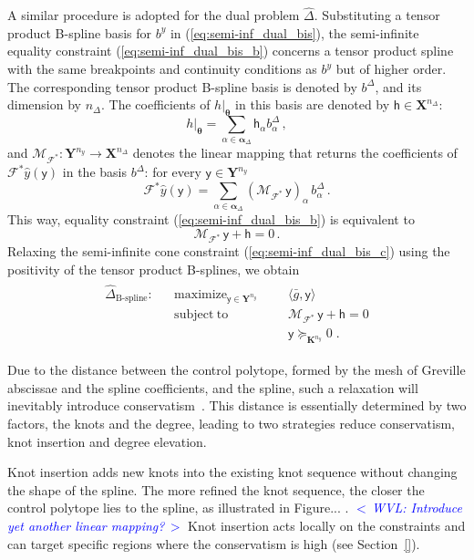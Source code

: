 \documentclass{article}
\DeclareMathOperator*{\maximize}{maximize}
\DeclareMathOperator*{\subj}{subject\;to}
\newcommand{\commentWVL}[1]{\noindent \textcolor{blue}{\emph{$<\,$WVL: #1$\,>$}}}%
\newcommand{\adj}{\ast}                     %
\newcommand{\Ppar}{{\bm{\theta}}}                   %
\newcommand{\X}{\mathbf{X}}                         %
\newcommand{\Y}{\mathbf{Y}}                         %
\newcommand{\K}{\mathbf{K}}                         %
\newcommand{\calF}{\mathcal{F}}                     %
\newcommand{\by}{b^y}               %
\newcommand{\cy}{\textsf{y}}        %
\newcommand{\ny}{{n_y}}             %
\newcommand{\Alpha}{\bm{\alpha}}    %
\newcommand{\meang}{\bar{g}}        %
\newcommand{\bDelta}{b^\Delta}          %
\newcommand{\bDeltaa}{b^\Delta_\alpha}  %
\newcommand{\nDelta}{{n_\Delta}}        %
\newcommand{\ch}{\textsf{h}}            %
\newcommand{\cha}{\textsf{h}_\alpha}    %
\newcommand{\calMFadj}{\mathcal{M}_{\mathcal{F}^\adj}}
\begin{document}
A similar procedure is adopted for the dual problem $\hat{\Delta}$. Substituting a tensor product B-spline basis for $\by$ in (\ref{eq:semi-inf_dual_bis}), the semi-infinite equality constraint (\ref{eq:semi-inf_dual_bis_b}) concerns a tensor product spline with the same breakpoints and continuity conditions as $\by$ but of higher order. The corresponding tensor product B-spline basis is denoted by $\bDelta$, and its dimension by $\nDelta$. The coefficients of $h|_\Ppar$ in this basis are denoted by $\ch\in\X^\nDelta$:
\[ h|_\Ppar = \sum_{\alpha\in\Alpha_\Delta} \cha \bDeltaa \,,%
\]
and $\calMFadj:\Y^\ny \rightarrow \X^\nDelta$ denotes the linear mapping that returns the coefficients of $\calF^\adj\hat{y}(\cy)$ in the basis $\bDelta$: for every $\cy\in\Y^\ny$
\[ \calF^\adj \hat{y}(\cy) = \sum_{\alpha\in\Alpha_\Delta} (\calMFadj \, \cy)_\alpha \, \bDeltaa\,. %
\]
This way, equality constraint (\ref{eq:semi-inf_dual_bis_b}) is equivalent to
\[ \calMFadj\,\cy + \ch = 0 \,.
\]
Relaxing the semi-infinite cone constraint (\ref{eq:semi-inf_dual_bis_c}) using the positivity of the tensor product B-splines, we obtain
\begin{gather}\label{eq:Bprog_dual}
\begin{aligned}
\hat{\Delta}_{\text{B-spline}}: && \maximize_{\cy\in\Y^\ny} &&& \langle \meang, \cy \rangle \\%
                                && \subj                    &&& \calMFadj\,\cy + \ch = 0 \\%
                                &&                          &&& \cy \succeq_{\K^\ny} 0     \;.%
\end{aligned}
\end{gather}

Due to the distance between the control polytope, formed by the mesh of
Greville abscissae and the spline coefficients, and the spline, such a
relaxation will inevitably introduce conservatism~\cite{deBoor_2001}. This distance
is essentially determined by two factors, the knots and the degree, leading to
two strategies reduce conservatism, knot insertion and degree elevation.

Knot insertion adds new knots into the existing knot sequence without changing
the shape of the spline. The more refined the knot sequence, the closer the
control polytope lies to the spline, as illustrated in Figure... .
\commentWVL{Introduce yet another linear mapping?} Knot insertion acts locally
on the constraints and can target specific regions where the conservatism is
high (see Section~\ref{}).
\end{document}
